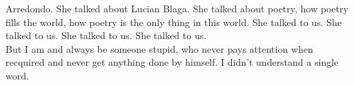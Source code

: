 \documentclass{article}
\begin{document}
Arredondo. She talked about Lucian Blaga. She talked about poetry, how poetry fills the world, how poetry is the only thing in this world. She talked to us. She talked to us. She talked to us. She talked to us. \\

But I am and always be someone stupid, who never pays attention when recquired and never get anything done by himself. I didn't understand a single word.
\end{document}
